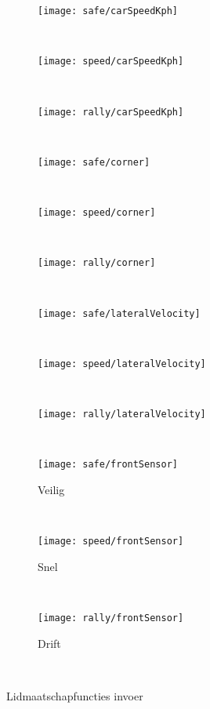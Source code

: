 \begin{figure}[h]
\centering
  \begin{subfigure}[b]{0.32\textwidth}
    \texttt{[image: safe/carSpeedKph]}
  \end{subfigure}%
  ~
  \begin{subfigure}[b]{0.32\textwidth}
    \texttt{[image: speed/carSpeedKph]}
  \end{subfigure}%
   ~
  \begin{subfigure}[b]{0.32\textwidth}
    \texttt{[image: rally/carSpeedKph]}
  \end{subfigure}\\
  \begin{subfigure}[b]{0.32\textwidth}
    \texttt{[image: safe/corner]}
  \end{subfigure}%
  ~
  \begin{subfigure}[b]{0.32\textwidth}
    \texttt{[image: speed/corner]}
  \end{subfigure}%
   ~
  \begin{subfigure}[b]{0.32\textwidth}
    \texttt{[image: rally/corner]}
  \end{subfigure}\\
  \begin{subfigure}[b]{0.32\textwidth}
    \texttt{[image: safe/lateralVelocity]}
  \end{subfigure}%
  ~
  \begin{subfigure}[b]{0.32\textwidth}
    \texttt{[image: speed/lateralVelocity]}
  \end{subfigure}%
   ~
  \begin{subfigure}[b]{0.32\textwidth}
    \texttt{[image: rally/lateralVelocity]}
  \end{subfigure}\\  
  \begin{subfigure}[b]{0.32\textwidth}
    \texttt{[image: safe/frontSensor]}
    \caption{Veilig}
    \label{fig:safe_in}
  \end{subfigure}%
  ~
  \begin{subfigure}[b]{0.32\textwidth}
    \texttt{[image: speed/frontSensor]}
    \caption{Snel}
    \label{fig:speed_in}
  \end{subfigure}%
   ~
  \begin{subfigure}[b]{0.32\textwidth}
    \texttt{[image: rally/frontSensor]}
    \caption{Drift}
    \label{fig:drift_in}
  \end{subfigure}\\ 
\caption{Lidmaatschapfuncties invoer}\label{fig:lidfties_in}
\end{figure}

